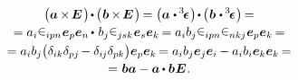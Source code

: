 \vspace{-1.1em}\begin{multline}\label{vectorcrossidentitydotvectorcrossidentity}
\bigl( \bm{a} \hspace{-0.1ex}\times\hspace{-0.25ex} \UnitDyad \hspace{.2ex}\bigr) \hspace{-0.25ex} \dotp \hspace{-0.15ex} \bigl(\hspace{.1ex} \bm{b} \hspace{-0.1ex}\times\hspace{-0.25ex} \UnitDyad \hspace{.2ex}\bigr) \hspace{-0.2ex}
= \bigl( \bm{a} \hspace{.1ex} \dotp \hspace{-0.1ex} \levicivitatensor \hspace{.1ex}\bigr) \hspace{-0.25ex} \dotp \hspace{-0.15ex} \bigl(\hspace{.1ex} \bm{b} \hspace{.1ex} \dotp \hspace{-0.1ex} \levicivitatensor \hspace{.1ex}\bigr) \hspace{-0.2ex} =
\\[-0.1em]
%
= a_i \levicivita_{ipn} \hspace{.1ex} \bm{e}_p \bm{e}_n \hspace{-0.15ex} \dotp \hspace{.2ex} b_j \levicivita_{jsk} \hspace{.1ex} \bm{e}_s \bm{e}_k \hspace{-0.2ex}
= a_i b_j \levicivita_{ipn} \levicivita_{nkj} \hspace{.05ex} \bm{e}_p \bm{e}_k \hspace{-0.2ex} =
\\[-0.1em]
%
= a_i b_j \bigl( \delta_{ik} \delta_{pj} \hspace{-0.22ex} - \delta_{i\hspace{-0.1ex}j} \delta_{pk} \bigr) \bm{e}_p \bm{e}_k \hspace{-0.2ex}
= a_i b_j \bm{e}_j \bm{e}_i \hspace{-0.12ex} - a_i b_i \bm{e}_k \bm{e}_k \hspace{-0.2ex} =
\\[-0.1em]
%
= \hspace{.1ex} \bm{b} \bm{a} - \bm{a} \hspace{-0.1ex} \dotp \bm{b} \hspace{.1ex} \UnitDyad
\hspace{.1ex} .
\end{multline}


